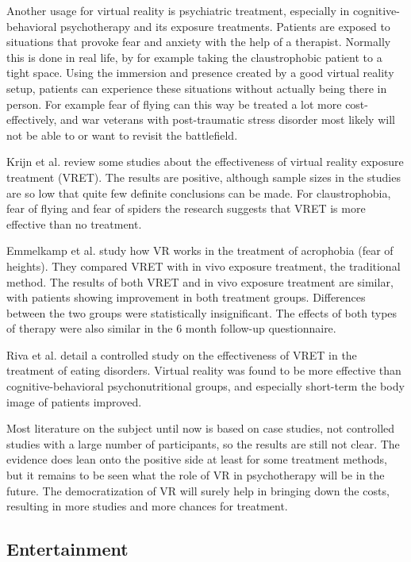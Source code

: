 \documentclass[12pt,a4paper,oneside,pdftex]{report}
\begin{document}
Another usage for virtual reality is psychiatric treatment, especially in cognitive-behavioral psychotherapy and its exposure treatments. Patients are exposed to situations that provoke fear and anxiety with the help of a therapist. Normally this is done in real life, by for example taking the claustrophobic patient to a tight space. Using the immersion and presence created by a good virtual reality setup, patients can experience these situations without actually being there in person. For example fear of flying can this way be treated a lot more cost-effectively, and war veterans with post-traumatic stress disorder most likely will not be able to or want to revisit the battlefield.

Krijn et al. \cite{krijn2004virtual} review some studies about the effectiveness of virtual reality exposure treatment (VRET). The results are positive, although sample sizes in the studies are so low that quite few definite conclusions can be made. For claustrophobia, fear of flying and fear of spiders the research suggests that VRET is more effective than no treatment.

Emmelkamp et al. \cite{emmelkamp2002virtual} study how VR works in the treatment of acrophobia (fear of heights). They compared VRET with in vivo exposure treatment, the traditional method. The results of both VRET and in vivo exposure treatment are similar, with patients showing improvement in both treatment groups. Differences between the two groups were statistically insignificant. The effects of both types of therapy were also similar in the 6 month follow-up questionnaire.

Riva et al. \cite{riva2002virtual} detail a controlled study on the effectiveness of VRET in the treatment of eating disorders. Virtual reality was found to be more effective than cognitive-behavioral psychonutritional groups, and especially short-term the body image of patients improved.

Most literature on the subject until now is based on case studies, not controlled studies with a large number of participants, so the results are still not clear. The evidence does lean onto the positive side at least for some treatment methods, but it remains to be seen what the role of VR in psychotherapy will be in the future. The democratization of VR will surely help in bringing down the costs, resulting in more studies and more chances for treatment.

\subsection{Entertainment}
\label{subsection:applications:entertainment}
\end{document}
